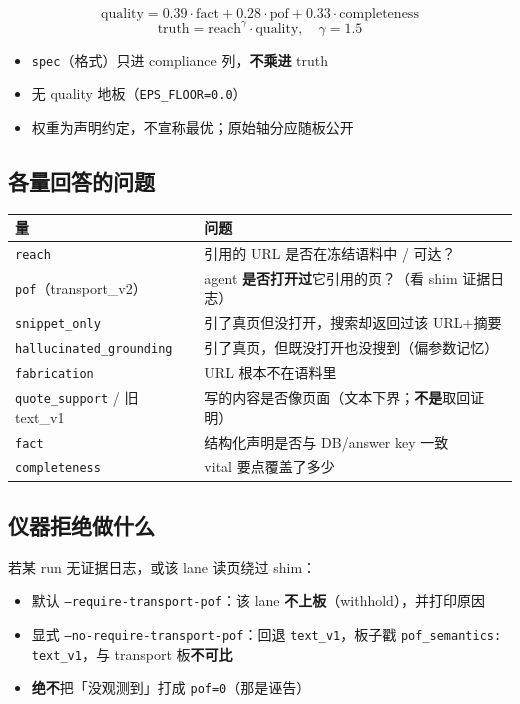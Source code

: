 \documentclass[10.5pt,a4paper]{article}
\begin{document}
\[
\mathrm{quality}=0.39\cdot\mathrm{fact}+0.28\cdot\mathrm{pof}+0.33\cdot\mathrm{completeness}
\]
\[
\mathrm{truth}=\mathrm{reach}^{\gamma}\cdot\mathrm{quality},\quad \gamma=1.5
\]

\begin{itemize}
  \item \texttt{spec}（格式）只进 compliance 列，\textbf{不乘进} truth
  \item 无 quality 地板（\texttt{EPS\_FLOOR=0.0}）
  \item 权重为声明约定，不宣称最优；原始轴分应随板公开
\end{itemize}

\subsection{各量回答的问题}

\begin{center}
\begin{tabularx}{\textwidth}{@{}lX@{}}
\toprule
量 & 问题 \\
\midrule
\texttt{reach} & 引用的 URL 是否在冻结语料中 / 可达？ \\
\texttt{pof}（transport\_v2） & agent \textbf{是否打开过}它引用的页？（看 shim 证据日志） \\
\texttt{snippet\_only} & 引了真页但没打开，搜索却返回过该 URL+摘要 \\
\texttt{hallucinated\_grounding} & 引了真页，但既没打开也没搜到（偏参数记忆） \\
\texttt{fabrication} & URL 根本不在语料里 \\
\texttt{quote\_support} / 旧 text\_v1 & 写的内容是否像页面（文本下界；\textbf{不是}取回证明） \\
\texttt{fact} & 结构化声明是否与 DB/answer key 一致 \\
\texttt{completeness} & vital 要点覆盖了多少 \\
\bottomrule
\end{tabularx}
\end{center}

\subsection{仪器拒绝做什么}

若某 run 无证据日志，或该 lane 读页绕过 shim：
\begin{itemize}
  \item 默认 \texttt{--require-transport-pof}：该 lane \textbf{不上板}（withhold），并打印原因
  \item 显式 \texttt{--no-require-transport-pof}：回退 \texttt{text\_v1}，板子戳 \texttt{pof\_semantics: text\_v1}，与 transport 板\textbf{不可比}
  \item \textbf{绝不}把「没观测到」打成 \texttt{pof=0}（那是诬告）
\end{itemize}
\end{document}
